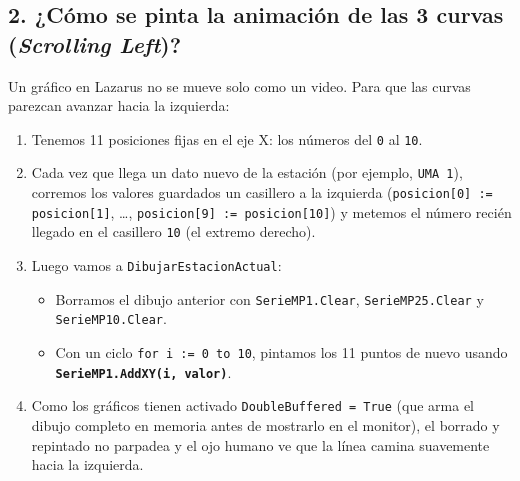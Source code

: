 \documentclass[11pt,a4paper]{article}
\begin{document}
\subsection{2. ¿Cómo se pinta la animación de las 3 curvas (\emph{Scrolling Left})?}
Un gráfico en Lazarus no se mueve solo como un video. Para que las curvas parezcan avanzar hacia la izquierda:
\begin{enumerate}[leftmargin=1.5em]
    \item Tenemos 11 posiciones fijas en el eje X: los números del \texttt{0} al \texttt{10}.
    \item Cada vez que llega un dato nuevo de la estación (por ejemplo, \texttt{UMA 1}), corremos los valores guardados un casillero a la izquierda (\texttt{posicion[0] := posicion[1]}, \dots, \texttt{posicion[9] := posicion[10]}) y metemos el número recién llegado en el casillero \texttt{10} (el extremo derecho).
    \item Luego vamos a \texttt{DibujarEstacionActual}:
    \begin{itemize}
        \item Borramos el dibujo anterior con \texttt{SerieMP1.Clear}, \texttt{SerieMP25.Clear} y \texttt{SerieMP10.Clear}.
        \item Con un ciclo \texttt{for i := 0 to 10}, pintamos los 11 puntos de nuevo usando \textbf{\texttt{SerieMP1.AddXY(i, valor)}}.
    \end{itemize}
    \item Como los gráficos tienen activado \texttt{DoubleBuffered = True} (que arma el dibujo completo en memoria antes de mostrarlo en el monitor), el borrado y repintado no parpadea y el ojo humano ve que la línea camina suavemente hacia la izquierda.
\end{enumerate}
\end{document}
